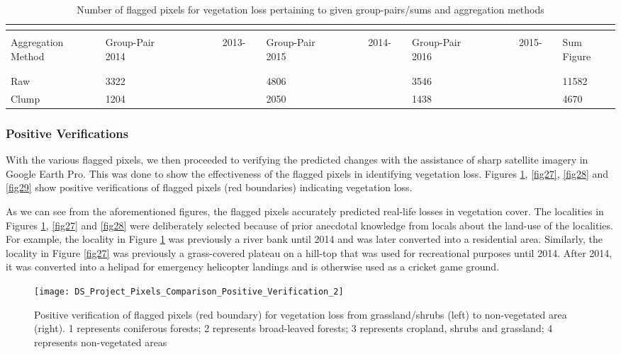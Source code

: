 \begin{ThreePartTable}
	\centering
	\small
	\def\arraystretch{1.3}
	\begin{longtable}{L{3cm} L{3cm} L{3cm} L{3cm} L{2cm}}
		\caption{Number of flagged pixels for vegetation loss pertaining to given group-pairs/sums and aggregation methods}
		\hskip15pt	
		\label{table18}\\
		\toprule[0.25mm]\\[-0.5cm]
		Aggregation Method & Group-Pair ~~~~~~~~~~~~~2013-2014& Group-Pair ~~~~~~~~~~2014-2015& Group-Pair ~~~~~~~~~~~2015-2016& Sum Figure \\\\[-0.5cm]
		\midrule[0.35mm]\\[-0.4cm]
		Raw & 3322 & 4806 & 3546 & 11582\\
		Clump & 1204 &2050& 1438 & 4670\\[0.05cm]
		\bottomrule[0.25mm]
	\end{longtable}
\end{ThreePartTable}

\subsubsection{Positive Verifications}

\justify
With the various flagged pixels, we then proceeded to verifying the predicted changes with the assistance of sharp satellite imagery in Google Earth Pro. This was done to show the effectiveness of the flagged pixels in identifying vegetation loss. Figures \ref{fig26}, \ref{fig27}, \ref{fig28} and \ref{fig29} show positive verifications of flagged pixels (red boundaries) indicating vegetation loss.

\justify
As we can see from the aforementioned figures, the flagged pixels accurately predicted real-life losses in vegetation cover. The localities in Figures \ref{fig26}, \ref{fig27} and \ref{fig28} were deliberately selected because of prior anecdotal knowledge from locals about the land-use of the localities. For example, the locality in Figure \ref{fig26} was previously a river bank until 2014 and was later converted into a residential area. Similarly, the locality in Figure \ref{fig27} was previously a grass-covered plateau on a hill-top that was used for recreational purposes until 2014. After 2014, it was converted into a helipad for emergency helicopter landings and is otherwise used as a cricket game ground. 

\begin{figure}[H]
	\centering
	\texttt{[image: DS\_Project\_Pixels\_Comparison\_Positive\_Verification\_2]}
	\caption[Positive verification of flagged pixels (red boundary) for vegetation loss from grassland/shrubs (left) to non-vegetated area (right)]{Positive verification of flagged pixels (red boundary) for vegetation loss from grassland/shrubs (left) to non-vegetated area (right). 1 represents coniferous forests; 2 represents broad-leaved forests; 3 represents cropland, shrubs and grassland; 4 represents non-vegetated areas}
	\label{fig26}
\end{figure}

